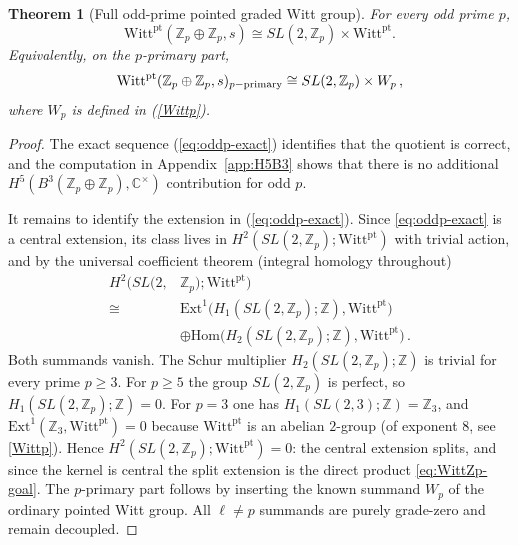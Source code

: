 \documentclass[aps,twocolumn,prx,floatfix,preprintnumbers, nofootinbib,10pt]{revtex4-2}
\numberwithin{equation}{section}
\newtheorem{theorem}{Theorem}[section]
\theoremstyle{definition}
\theoremstyle{remark}
\theoremstyle{claim}
\newcommand{\be}{\begin{equation}}
\newcommand{\ee}{\end{equation}}
\newcommand{\ba}{\begin{aligned}}
\newcommand{\ea}{\end{aligned}}
\newcommand{\Z}{{\mathbb Z}}
\newcommand{\Witt}{\text{Witt}}
\newcommand{\pt}{\text{pt}}
\begin{document}
\begin{theorem}[Full odd-prime pointed graded Witt group]\label{thm:WittZp}
For every odd prime $p$,
\be
  \Witt^\pt(\Z_p\oplus\Z_p,s)
  \cong SL(2,\Z_p)\times\Witt^\pt .
\ee
Equivalently, on the $p$-primary part,
\be
  \Witt^\pt({\Z_p \oplus \Z_p},s)_{p{\rm -primary}}
  \cong SL(2,\Z_p)\times W_p\,,
  \ee
  where $W_p$ is defined in (\ref{Wittp}).
\end{theorem}
\begin{proof}
The exact sequence (\ref{eq:oddp-exact}) identifies that the quotient is correct,  and the computation in Appendix~\ref{app:H5B3} shows that there is no
additional 
{$H^5(B^3(\Z_p \oplus \Z_p), \mathbb{C}^\times)$} contribution for odd $p$.

It remains to identify the extension in (\ref{eq:oddp-exact}).
Since \eqref{eq:oddp-exact} is a central extension, its class lives in
$H^2(SL(2,\Z_p);\Witt^\pt)$ with trivial action, and by the universal
coefficient theorem (integral homology throughout)
\be
\ba
H^2\big(SL(2,&\Z_p);\Witt^\pt\big)\\
\cong\ & \mathrm{Ext}^1\big(H_1(SL(2,\Z_p);\Z),\Witt^\pt\big)\\
&\oplus \mathrm{Hom}\big(H_2(SL(2,\Z_p);\Z),\Witt^\pt\big) \,.
\ea
\label{eq:H2UCT}
\ee
Both summands vanish.  The Schur multiplier $H_2(SL(2,\Z_p);\Z)$ is trivial
for every prime $p\ge3$.  For
$p\ge5$ the group $SL(2,\Z_p)$ is perfect, so $H_1(SL(2,\Z_p);\Z)=0$.
For $p=3$ one has $H_1(SL(2,3);\Z)=\Z_3$, and $\mathrm{Ext}^1(\Z_3,\Witt^\pt)=0$
because $\Witt^\pt$ is an abelian $2$-group (of exponent $8$, see \eqref{Wittp}).
Hence $H^2(SL(2,\Z_p);\Witt^\pt)=0$: the central extension splits, and
since the kernel is central the split extension is the direct product
\eqref{eq:WittZp-goal}.
The $p$-primary part follows by inserting the known summand $W_p$ of
the ordinary pointed Witt group.  All $\ell\neq p$ summands are purely
grade-zero and remain decoupled.
\end{proof}
\end{document}
